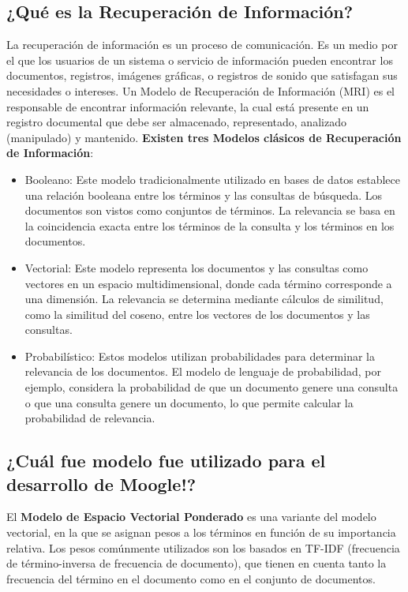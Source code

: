 \documentclass{article}
\begin{document}
\subsection*{¿Qué es la Recuperación de Información?}
La recuperación de información es un proceso de comunicación. Es un medio por
el que los usuarios de un sistema o servicio de información pueden encontrar los documentos,
registros, imágenes gráficas, o registros de sonido que satisfagan sus necesidades o intereses.
\newline
\newline
Un Modelo de Recuperación de Información (MRI) es el responsable de encontrar información
relevante, la cual está presente en un registro documental que debe ser almacenado,
representado, analizado (manipulado) y mantenido.
\newpage
\textbf{Existen tres Modelos clásicos de Recuperación de Información}:
\begin{itemize}
	\item Booleano: Este modelo tradicionalmente utilizado en bases de datos establece una
	      relación booleana entre los términos y las consultas de búsqueda. Los documentos son vistos
	      como conjuntos de términos. La relevancia se basa en la coincidencia exacta entre los
	      términos de la consulta y los términos en los documentos.
	\item Vectorial: Este modelo representa los documentos y las consultas como vectores en
	      un espacio multidimensional, donde cada término corresponde a una dimensión. La relevancia
	      se determina mediante cálculos de similitud, como la similitud del coseno, entre los
	      vectores de los documentos y las consultas.
	\item Probabilístico: Estos modelos utilizan probabilidades para determinar la
	      relevancia de los documentos. El modelo de lenguaje de probabilidad, por ejemplo,
	      considera la probabilidad de que un documento genere una consulta o que una consulta
	      genere un documento, lo que permite calcular la probabilidad de relevancia.
\end{itemize}

\subsection*{¿Cuál fue modelo fue utilizado para el desarrollo de Moogle!?}
	El \textbf{Modelo de Espacio Vectorial Ponderado} es una variante del modelo vectorial, en la que se
	asignan pesos a los términos en función de su importancia relativa. Los pesos comúnmente
	utilizados son los basados en TF-IDF (frecuencia de término-inversa de frecuencia de documento),
	que tienen en cuenta tanto la frecuencia del término en el documento como en el conjunto de
	documentos.
\end{document}
